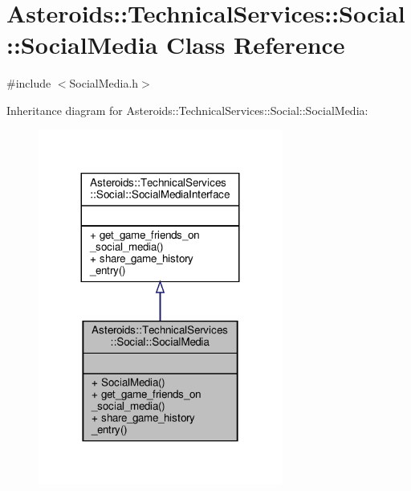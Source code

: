 \hypertarget{classAsteroids_1_1TechnicalServices_1_1Social_1_1SocialMedia}{}\section{Asteroids\+:\+:Technical\+Services\+:\+:Social\+:\+:Social\+Media Class Reference}
\label{classAsteroids_1_1TechnicalServices_1_1Social_1_1SocialMedia}


{\ttfamily \#include $<$Social\+Media.\+h$>$}



Inheritance diagram for Asteroids\+:\+:Technical\+Services\+:\+:Social\+:\+:Social\+Media\+:
\nopagebreak
\begin{figure}[H]
\begin{center}
\leavevmode
\includegraphics[width=227pt]{classAsteroids_1_1TechnicalServices_1_1Social_1_1SocialMedia__inherit__graph}
\end{center}
\end{figure}


